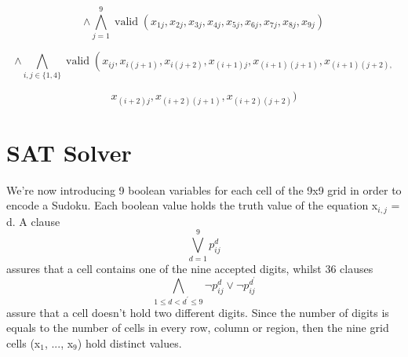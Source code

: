 \documentclass[paper=a4, fontsize=14pt]{scrartcl} %
\begin{document}
	\[ \wedge \bigwedge_{j=1}^{9} \operatorname{valid}\left(x_{1 j}, x_{2 j}, x_{3 j}, x_{4 j}, x_{5 j}, x_{6 j}, x_{7 j}, x_{8 j}, x_{9 j}\right)\]
	
	\[ \wedge \bigwedge_{i, j \in\{1,4\}} \operatorname{valid}\left(x_{i j}, x_{i(j+1)}, x_{i(j+2)}, x_{(i+1) j}, x_{(i+1)(j+1)}, x_{(i+1)(j+2),}\right.\]
	
	\[ x_{(i+2) j}, x_{(i+2)(j+1)}, x_{(i+2)(j+2)} )\]
	
	\section*{SAT Solver}
	We're now introducing 9 boolean variables for each cell of the 9x9 grid in order to encode a Sudoku.
	\newline
	Each boolean value holds the truth value of the equation x$_{i,j}$ = d.
	\newline A clause \[\bigvee_{d=1}^{9} p_{i j}^{d}\] assures that a cell contains one of the nine accepted digits, whilst 36 clauses
	\newline
	\[\bigwedge_{1 \leq d<d^{\prime} \leq 9} \neg p_{i j}^{d} \vee \neg p_{i j}^{d^{\prime}} \]
	assure that a cell doesn't hold two different digits.
	\newline
	Since the number of digits is equals to the number of cells in every row, column or region, then the nine grid cells (x$_1$, ..., x$_9$) hold distinct values.
	\newline
\end{document}
